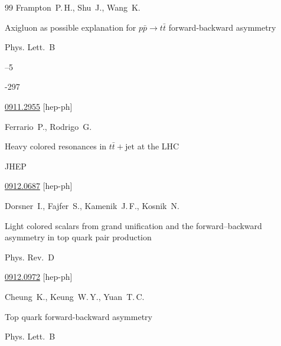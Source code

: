 \begin{thebibliography}{99}
\by  Frampton~P.\,H., Shu~J., Wang~K.

\paper Axigluon as possible explanation for  $p\bar{p} \to t\bar{t}$ forward-backward asymmetry 

\jour Phys. Lett.~B 



--5

-297

\arxiv \href{http://arxiv.org/abs/0911.2955}{0911.2955} [hep-ph]





\by  Ferrario~P., Rodrigo~G.

\paper Heavy colored resonances in $t \bar t + \text{jet}$ at the LHC

\jour JHEP





\arxiv \href{http://arxiv.org/abs/0912.0687}{0912.0687} [hep-ph]





\by Dorsner~I., Fajfer~S., Kamenik~J.\,F., Kosnik~N.

\paper Light colored scalars from grand unification and the forward--backward asymmetry in top quark pair production

\jour Phys. Rev.~D






\arxiv \href{http://arxiv.org/abs/0912.0972}{0912.0972} [hep-ph]





\by Cheung~K., Keung~W.\,Y., Yuan~T.\,C.

\paper Top quark forward-backward asymmetry

\jour Phys. Lett.~B


\end{thebibliography}
